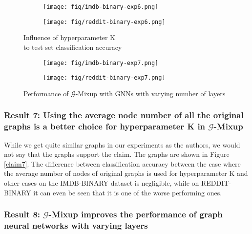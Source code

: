 \begin{figure}
\centering
\begin{minipage}{.5\textwidth}
  \begin{subfigure}{.5\textwidth}
  \centering
  \texttt{[image: fig/imdb-binary-exp6.png]}
\end{subfigure}%
\begin{subfigure}{.5\textwidth}
  \centering
  \texttt{[image: fig/reddit-binary-exp6.png]}
\end{subfigure}
\caption{Influence of hyperparameter K \\ to test set classification accuracy}
\label{claim7}
\end{minipage}%
\begin{minipage}{.5\textwidth}
  \begin{subfigure}{.5\textwidth}
  \centering
  \texttt{[image: fig/imdb-binary-exp7.png]}
\end{subfigure}%
\begin{subfigure}{.5\textwidth}
  \centering
  \texttt{[image: fig/reddit-binary-exp7.png]}
\end{subfigure}
\caption{Performance of $\mathcal{G}$-Mixup with GNNs with varying number of layers}
\label{claim8}
\end{minipage}
\end{figure}

\subsubsection{Result 7: Using the average node number of all the original graphs is a better choice for hyperparameter K in $\mathcal{G}$-Mixup}

While we get quite similar graphs in our experiments as the authors, we would not say that the graphs support the claim. The graphs are shown in Figure \ref{claim7}. The difference between classification accuracy between the case where the average number of nodes of original graphs is used for hyperparameter K and other cases on the IMDB-BINARY dataset is negligible, while on REDDIT-BINARY it can even be seen that it is one of the worse performing ones. 

\subsubsection{Result 8: $\mathcal{G}$-Mixup improves the performance of graph neural networks with varying layers}


